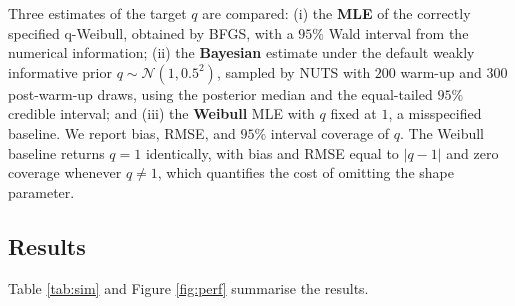 \documentclass[ASNA,twocolumn]{USG}
\begin{document}
Three estimates of the target $q$ are compared: (i) the \textbf{MLE} of
the correctly specified q-Weibull, obtained by BFGS, with a $95\%$ Wald
interval from the numerical information; (ii) the \textbf{Bayesian}
estimate under the default weakly informative prior
$q\sim\mathcal N(1,0.5^2)$, sampled by NUTS with $200$ warm-up and $300$
post-warm-up draws, using the posterior median and the equal-tailed $95\%$
credible interval; and (iii) the \textbf{Weibull} MLE with $q$ fixed at
$1$, a misspecified baseline. We report bias, RMSE, and $95\%$ interval
coverage of $q$. The Weibull baseline returns $q=1$ identically, with
bias and RMSE equal to $|q-1|$ and zero coverage whenever $q\neq1$, which
quantifies the cost of omitting the shape parameter.

\subsection{Results}\label{sec:simresults}
Table \ref{tab:sim} and Figure \ref{fig:perf} summarise the results.
\end{document}
